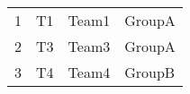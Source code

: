 \begin{tabular}{|l|l|l|l|}
1& T1&Team1&GroupA\\
2& T3&Team3&GroupA\\
3& T4&Team4&GroupB\\
\end{tabular}
